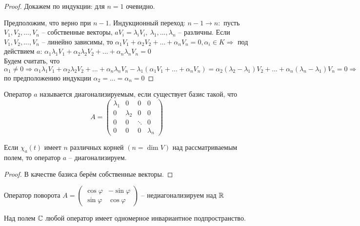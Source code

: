 \begin{proof}
	Докажем по индукции: для $n = 1$ очевидно.

	Предположим, что верно при $n-1$. Индукционный переход: $n-1 \to n:$ пусть $V_1, V_2, ..., V_n$ -- собственные векторы, $aV_i = \lambda_i V_i, \ \lambda_1, ..., \lambda_n$ -- различны.
	Если $V_1, V_2, ..., V_n$ -- линейно зависимы, то $\alpha_1 V_1 + \alpha_2 V_2 + ... + \alpha_n V_n = 0, \alpha_i \in K \Rightarrow$
	под действием $a$: $\alpha_1 \lambda_1 V_1 + \alpha_2 \lambda_2 V_2 + ... + \alpha_n \lambda_n V_n = 0$\\
	Будем считать, что $\alpha_1 \neq 0 \Rightarrow \alpha_1 \lambda_1 V_1 + \alpha_2 \lambda_2 V_2 + ... + \alpha_n \lambda_n V_n - \lambda_1(\alpha_1 V_1 + ... + \alpha_n V_n) =
	\alpha_2(\lambda_2 - \lambda_1)V_2 + ... + \alpha_n(\lambda_n - \lambda_1)V_n = 0 \Rightarrow$ по предположению индукции $\alpha_2 = ... = \alpha_n = 0$ 
\end{proof}

\begin{Def} 
	Оператор $a$ называется диагонализируемым, если существует базис такой, что $$A = \left(\begin{array}{cccc}
		\lambda_1 & 0 & 0 & 0\\
		0 & \lambda_2 & 0 & 0\\
		0 & 0 & \ddots & 0\\
		0 & 0 & 0 & \lambda_n
	\end{array}
	\right)$$
\end{Def} 

\begin{Thm} 
	Если $\chi_a(t)$ имеет $n$ различных корней $(n = \dim V)$ над рассматриваемым полем, то оператор $a$ -- диагонализируем. 
\end{Thm} 

\begin{proof}
	В качестве базиса берём собственные векторы. 
\end{proof}

\begin{Example}
	Оператор поворота $A = \left(\begin{array}{cc}
		\cos \varphi & - \sin \varphi\\
		\sin \varphi & \cos \varphi
	\end{array}\right)$ -- недиагонализируем над $\mathbb{R}$
\end{Example}

\begin{Lm}
	Над полем $\mathbb{C}$ любой оператор имеет одномерное инвариантное подпространство.
\end{Lm}


